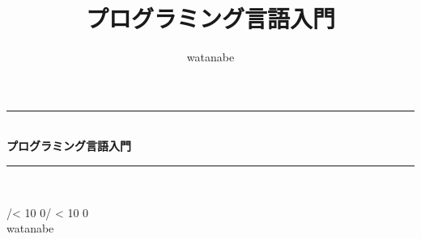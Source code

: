 \documentclass[a5paper,mingoth,oneside,14pt]{jsbook}
\title{ {\Huge プログラミング言語入門}}
\author{watanabe}
\newcommand{\todayd}{%
\the\year/{\ifnum \month < 10 0\the\month \else \the\month \fi}/%
{\ifnum \day < 10 0\the\day \else \the\day \fi}}
\newcommand{\HRule}{\rule{\linewidth}{0.5mm}}
\begin{document}
\begin{titlepage}
\begin{center}

\vspace*{5cm}
\HRule \\[0.4cm]
{ \huge \bfseries プログラミング言語入門}\\[0.4cm]

\HRule \\[1.5cm]

\vspace*{8cm}

\begin{minipage}{0.4\textwidth}
\begin{flushright} \large
{\large \todayd} \\

watanabe
\end{flushright}
\end{minipage}


\vspace*{3cm}

\end{center}
\end{titlepage}




\tableofcontents








\end{document}
